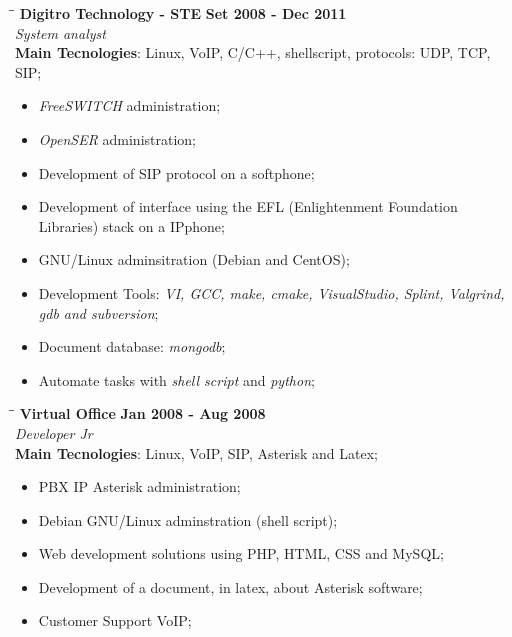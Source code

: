 \documentclass[margin]{res}
\begin{document}
\begin{resume}
   \begin{tabbing}
   \hspace{2.3in}\= \hspace{1.5in}\= \kill %
    \textbf{Digitro Technology - STE}    \>\>\textbf{Set 2008 - Dec 2011}\\
    \textit{System analyst}\\   
    \textbf{Main Tecnologies}: Linux, VoIP, C/C++, shellscript, protocols: UDP, TCP, SIP;
   \end{tabbing}\vspace{-20pt}      %
    \vspace{5mm}
    \begin{itemize}
      \item \textit{FreeSWITCH} administration;
      \item \textit{OpenSER} administration;
      \item Development of SIP protocol on a softphone; 
      \item Development of interface using the EFL (Enlightenment Foundation Libraries) stack on a IPphone;  
      \item GNU/Linux adminsitration (Debian and CentOS); 
      \item Development Tools: \textit{VI, GCC, make, cmake, VisualStudio, Splint, Valgrind, gdb and subversion};
      \item Document database: \textit{mongodb}; 
      \item Automate tasks with \textit{shell script} and \textit{python};
    \end{itemize}

   \begin{tabbing}
   \hspace{2.3in}\= \hspace{1.5in}\= \kill %
    \textbf{Virtual Office}    \>\>\textbf{Jan 2008 - Aug 2008}\\
    \textit{Developer Jr}\\
    \textbf{Main Tecnologies}: Linux, VoIP, SIP, Asterisk and Latex;
   \end{tabbing}\vspace{-20pt}      %
    \vspace{5mm}
    \begin{itemize}
      \item PBX IP Asterisk administration;
      \item Debian GNU/Linux adminstration (shell script);
      \item Web development solutions using PHP, HTML, CSS and MySQL; 
      \item Development of a document, in latex, about Asterisk software; 
      \item Customer Support VoIP;
    \end{itemize}


\end{resume}
\end{document}
